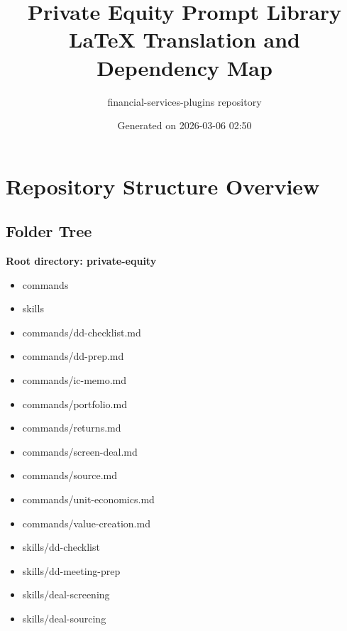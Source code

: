 \documentclass[11pt]{article}
\title{Private Equity Prompt Library\\LaTeX Translation and Dependency Map}
\author{financial-services-plugins repository}
\date{Generated on 2026-03-06 02:50 }
\begin{document}
\maketitle
\tableofcontents
\newpage

\section{Repository Structure Overview}

\subsection{Folder Tree}
\textbf{Root directory: private-equity}
\begin{itemize}[leftmargin=*,itemsep=1pt,topsep=2pt]
\item \hspace*{0.0em}commands
\item \hspace*{0.0em}skills
\item \hspace*{0.9em}commands/dd-checklist.md
\item \hspace*{0.9em}commands/dd-prep.md
\item \hspace*{0.9em}commands/ic-memo.md
\item \hspace*{0.9em}commands/portfolio.md
\item \hspace*{0.9em}commands/returns.md
\item \hspace*{0.9em}commands/screen-deal.md
\item \hspace*{0.9em}commands/source.md
\item \hspace*{0.9em}commands/unit-economics.md
\item \hspace*{0.9em}commands/value-creation.md
\item \hspace*{0.9em}skills/dd-checklist
\item \hspace*{0.9em}skills/dd-meeting-prep
\item \hspace*{0.9em}skills/deal-screening
\item \hspace*{0.9em}skills/deal-sourcing

\end{itemize}
\end{document}

